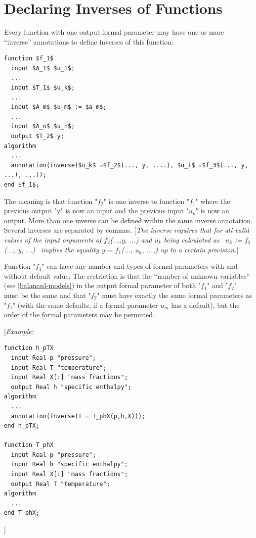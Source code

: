 \documentclass[10pt,a4paper]{report}
\def\doublelabel#1{\label{#1}\hypertarget{#1}{}}
\begin{document}
\section{Declaring Inverses of Functions}\doublelabel{declaring-inverses-of-functions}

Every function with one output formal parameter may have one or more
``inverse'' annotations to define inverses of this function:

\begin{lstlisting}[language=modelica,mathescape=true]
function $f_1$
  input $A_1$ $u_1$;
  ...
  input $T_1$ $u_k$;
  ...
  input $A_m$ $u_m$ := $a_m$;
  ...
  input $A_n$ $u_n$;
  output $T_2$ y;
algorithm
  ...
  annotation(inverse($u_k$ =$f_2$(..., y, ....), $u_i$ =$f_3$(..., y, ...), ...));
end $f_1$;
\end{lstlisting}

The meaning is that function "$f_2$" is one inverse to
function "$f_1$" where the previous output "y" is now an
input and the previous input "$u_k$" is now an output. More
than one inverse can be defined within the same inverse annotation.
Several inverses are separated by commas. {[}\emph{The inverse requires
that for all valid values of the input arguments of
$f_2$(...,y, ...) and $u_k$ being calculated
as~ $u_k$ := $f_2$(..., y, ...)~ implies the
equality y = $f_1$(..., $u_k$, ...,) up to a
certain precision.}{]}

Function "$f_1$" can have any number and types of formal
parameters with and without default value. The restriction is that the
``number of unknown variables'' (see \ref{balanced-models}) in the output formal
parameter of both "$f_1$" and "$f_2$" must be
the same and that "$f_2$" must have exactly the same formal
parameters as "$f_1$" (with the same defaults, if a formal
parameter $u_m$ has a default), but the order of the formal
parameters may be permuted.

{[}\emph{Example:}

\begin{lstlisting}[language=modelica]
function h_pTX
  input Real p "pressure";
  input Real T "temperature";
  input Real X[:] "mass fractions";
  output Real h "specific enthalpy";
algorithm
  ...
  annotation(inverse(T = T_phX(p,h,X)));
end h_pTX;

function T_phX
  input Real p "pressure";
  input Real h "specific enthalpy";
  input Real X[:] "mass fractions";
  output Real T "temperature";
algorithm
  ...
end T_phX;
\end{lstlisting}
{]}
\end{document}
